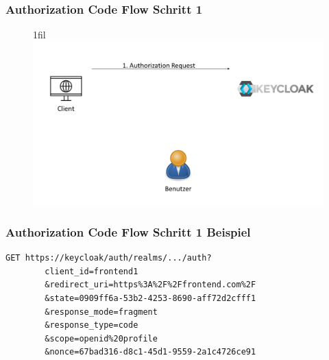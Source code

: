 \documentclass{beamer}
\begin{document}
\makeatletter
\newcommand*{\centerfloat}{%
  \parindent \z@
  \leftskip \z@ \@plus 1fil \@minus \textwidth
  \rightskip\leftskip
  \parfillskip \z@skip}
\makeatother

\begin{frame}
\frametitle{Authorization Code Flow Schritt 1}
\begin{figure}
\centerfloat
\includegraphics[width=1.1\linewidth]{img/authflow1.png}
\end{figure}
\end{frame}

\begin{frame}[fragile]
\frametitle{Authorization Code Flow Schritt 1 Beispiel}
\begin{lstlisting}[caption=Beispiel Authorization Request, captionpos=b, label=EBAuthorizationRequest]
GET https://keycloak/auth/realms/.../auth?
        client_id=frontend1
        &redirect_uri=https%3A%2F%2Ffrontend.com%2F
        &state=0909ff6a-53b2-4253-8690-aff72d2cfff1
        &response_mode=fragment
        &response_type=code
        &scope=openid%20profile
        &nonce=67bad316-d8c1-45d1-9559-2a1c4726ce91
\end{lstlisting}
\end{frame}
\end{document}
